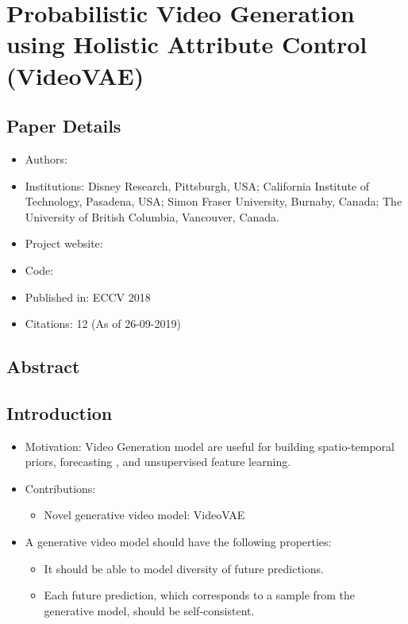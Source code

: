 \documentclass{article}
\begin{document}
    \section{Probabilistic Video Generation using Holistic Attribute Control (VideoVAE)}\label{sec:Probabilistic_Video_Generation_using_Holistic_Attribute_Control_(VideoVAE)}
    \subsection*{Paper Details}
    \begin{itemize}
        \item Authors:
        \item Institutions:
        Disney Research, Pittsburgh, USA;
        California Institute of Technology, Pasadena, USA;
        Simon Fraser University, Burnaby, Canada;
        The University of British Columbia, Vancouver, Canada.
        \item Project website:
        \item Code:
        \item Published in: ECCV 2018
        \item Citations: 12 (As of 26-09-2019)
    \end{itemize}

    \subsection*{Abstract}

    \subsection{Introduction}\label{subsec:Probabilistic_Video_Generation_using_Holistic_Attribute_Control_(VideoVAE):introduction}
    \begin{itemize}
        \item Motivation: Video Generation model are useful for building spatio-temporal priors, forecasting , and unsupervised feature learning.
        \item Contributions:
        \begin{itemize}
            \item Novel generative video model: VideoVAE
        \end{itemize}
        \item A generative video model should have the following properties:
        \begin{itemize}
            \item It should be able to model diversity of future predictions.
            \item Each future prediction, which corresponds to a sample from the generative model, should be self-consistent.
        \end{itemize}
    \end{itemize}
\end{document}
